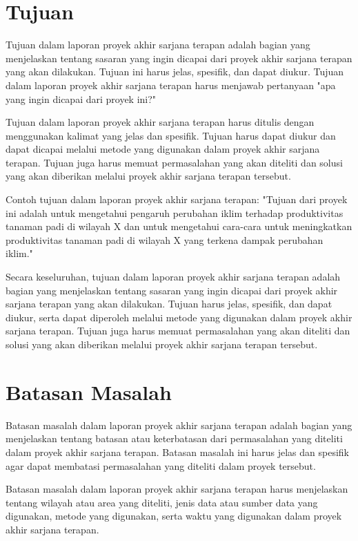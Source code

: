 \section{Tujuan}
Tujuan dalam laporan proyek akhir sarjana terapan adalah bagian yang menjelaskan tentang sasaran yang ingin dicapai dari proyek akhir sarjana terapan yang akan dilakukan. Tujuan ini harus jelas, spesifik, dan dapat diukur. Tujuan dalam laporan proyek akhir sarjana terapan harus menjawab pertanyaan "apa yang ingin dicapai dari proyek ini?"

Tujuan dalam laporan proyek akhir sarjana terapan harus ditulis dengan menggunakan kalimat yang jelas dan spesifik. Tujuan harus dapat diukur dan dapat dicapai melalui metode yang digunakan dalam proyek akhir sarjana terapan. Tujuan juga harus memuat permasalahan yang akan diteliti dan solusi yang akan diberikan melalui proyek akhir sarjana terapan tersebut.

Contoh tujuan dalam laporan proyek akhir sarjana terapan:
"Tujuan dari proyek ini adalah untuk mengetahui pengaruh perubahan iklim terhadap produktivitas tanaman padi di wilayah X dan untuk mengetahui cara-cara untuk meningkatkan produktivitas tanaman padi di wilayah X yang terkena dampak perubahan iklim."

Secara keseluruhan, tujuan dalam laporan proyek akhir sarjana terapan adalah bagian yang menjelaskan tentang sasaran yang ingin dicapai dari proyek akhir sarjana terapan yang akan dilakukan. Tujuan harus jelas, spesifik, dan dapat diukur, serta dapat diperoleh melalui metode yang digunakan dalam proyek akhir sarjana terapan. Tujuan juga harus memuat permasalahan yang akan diteliti dan solusi yang akan diberikan melalui proyek akhir sarjana terapan tersebut.


\section{Batasan Masalah}
Batasan masalah dalam laporan proyek akhir sarjana terapan adalah bagian yang menjelaskan tentang batasan atau keterbatasan dari permasalahan yang diteliti dalam proyek akhir sarjana terapan. Batasan masalah ini harus jelas dan spesifik agar dapat membatasi permasalahan yang diteliti dalam proyek tersebut.

Batasan masalah dalam laporan proyek akhir sarjana terapan harus menjelaskan tentang wilayah atau area yang diteliti, jenis data atau sumber data yang digunakan, metode yang digunakan, serta waktu yang digunakan dalam proyek akhir sarjana terapan.

